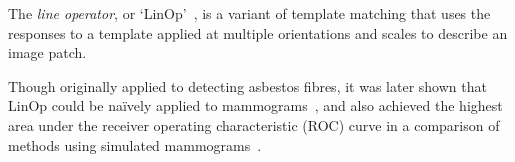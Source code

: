 \label{s:filtering_linop}
The \emph{line operator}, or `LinOp'~\cite{Dixon_Taylor_IPC79}, is a variant of template matching that uses the responses to a template applied at multiple orientations and scales to describe an image patch. 



Though originally applied to detecting asbestos fibres, it was later shown that LinOp could be na\"ively applied to mammograms~\cite{Parr_etal_SPIE97}, and also achieved the highest area under the receiver operating characteristic (ROC) curve in a comparison of methods using simulated mammograms~\cite{Zwiggelaar_etal_TMI04}.
